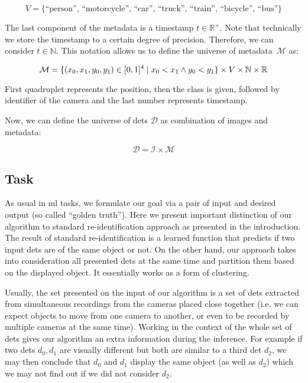 $$V = \{\text{``person'', ``motorcycle'', ``car'', ``truck'', ``train'', ``bicycle'', ``bus''\}}$$

The last component of the metadata is a timestamp $t \in \mathbb{R}^+$. Note that
technically we store the timestamp to a certain degree of precision. Therefore,
we can consider $t \in \mathbb{N}$. This notation allows us to define
the universe of metadata~$\mathcal{M}$ as:

$$\mathcal{M} = \{{(x_0, x_1, y_0, y_1) \in [0,1]^4 \mid x_0 < x_1 \land y_0 < y_1}\} \times V \times \mathbb{N} \times \mathbb{R}$$

First quadruplet represents the position, then the class is given, followed
by identifier of the camera and the last number represents timestamp.

Now, we can define the universe of \glspl{det} $\mathcal{D}$ as combination
of images and metadata:

$$\mathcal{D} = \mathcal{I \times M}$$

\subsection{Task}

\label{ssec:task}

As usual in \gls{ml} tasks, we formulate our goal via a pair of input and
desired output (so called ``golden truth''). Here we present important
distinction of our algorithm to standard re-identification approach as presented
in the introduction. The result of standard re-identification is a learned
function that predicts if two input \glspl{det} are of the same object or not.
On the other hand, our approach takes into consideration all presented
\glspl{det} at the same time and partition them based on the displayed object.
It essentially works as a form of clustering.

Usually, the set presented on the input of our algorithm is a set of
\glspl{det} extracted from simultaneous recordings from the cameras placed close
together (i.e. we can expect objects to move from one camera 
to another, or even to be recorded by multiple cameras at the same time).
Working in the context of the whole
set of \glspl{det} gives our algorithm an extra information during the inference.
For example if two \glspl{det} $d_0, d_1$ are visually 
different but both are similar to a third \gls{det} $d_2$, we may then 
conclude that $d_0$ and $d_1$ display the same object (as well as $d_2$) which
we may not find out if we did not consider $d_2$.

